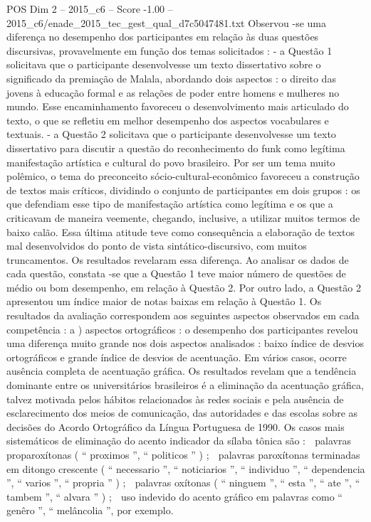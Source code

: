 \begin{textsample}{POS Dim 2 – 2015\_c6 – Score -1.00 – 2015\_c6/enade\_2015\_tec\_gest\_qual\_d7c5047481.txt}
Observou -se uma diferença no desempenho dos participantes em relação às duas questões discursivas, provavelmente em função dos temas solicitados : - a Questão 1 solicitava que o participante desenvolvesse um texto dissertativo sobre o significado da premiação de Malala, abordando dois aspectos : o direito das jovens à educação formal e as relações de poder entre homens e mulheres no mundo.
Esse encaminhamento favoreceu o desenvolvimento mais articulado do texto, o que se refletiu em melhor desempenho dos aspectos vocabulares e textuais. - a Questão 2 solicitava que o participante desenvolvesse um texto dissertativo para discutir a questão do reconhecimento do funk como legítima manifestação artística e cultural do povo brasileiro.
Por ser um tema muito polêmico, o tema do preconceito sócio-cultural-econômico favoreceu a construção de textos mais críticos, dividindo o conjunto de participantes em dois grupos : os que defendiam esse tipo de manifestação artística como legítima e os que a criticavam de maneira veemente, chegando, inclusive, a utilizar muitos termos de baixo calão.
Essa última atitude teve como consequência a elaboração de textos mal desenvolvidos do ponto de vista sintático-discursivo, com muitos truncamentos.
Os resultados revelaram essa diferença.
Ao analisar os dados de cada questão, constata -se que a Questão 1 teve maior número de questões de médio ou bom desempenho, em relação à Questão 2.
Por outro lado, a Questão 2 apresentou um índice maior de notas baixas em relação à Questão 1.
Os resultados da avaliação correspondem aos seguintes aspectos observados em cada competência : a ) aspectos ortográficos : o desempenho dos participantes revelou uma diferença muito grande nos dois aspectos analisados : baixo índice de desvios ortográficos e grande índice de desvios de acentuação.
Em vários casos, ocorre ausência completa de acentuação gráfica.
Os resultados revelam que a tendência dominante entre os universitários brasileiros é a eliminação da acentuação gráfica, talvez motivada pelos hábitos relacionados às redes sociais e pela ausência de esclarecimento dos meios de comunicação, das autoridades e das escolas sobre as decisões do Acordo Ortográfico da Língua Portuguesa de 1990.
Os casos mais sistemáticos de eliminação do acento indicador da sílaba tônica são :  palavras proparoxítonas ( “ proximos ”, “ politicos ” ) ;  palavras paroxítonas terminadas em ditongo crescente ( “ necessario ”, “ noticiarios ”, “ individuo ”, “ dependencia ”, “ varios ”, “ propria ” ) ;  palavras oxítonas ( “ ninguem ”, “ esta ”, “ ate ”, “ tambem ”, “ alvara ” ) ;  uso indevido do acento gráfico em palavras como “ genêro ”, “ melâncolia ”, por exemplo.

\end{textsample}
